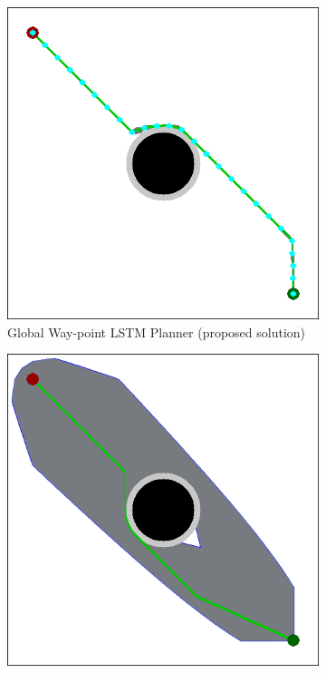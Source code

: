 \begin{figure}[h!]
  \centering
  \begin{subfigure}[b]{0.32\linewidth}
    \includegraphics[width=\linewidth]{images/screenshot_51.png}
    \caption{Global Way-point LSTM Planner (proposed solution)}
  \end{subfigure}
  \hspace{2cm}
  \begin{subfigure}[b]{0.32\linewidth}
    \includegraphics[width=\linewidth]{images/screenshot_44.png}

\end{subfigure}
\end{figure}

